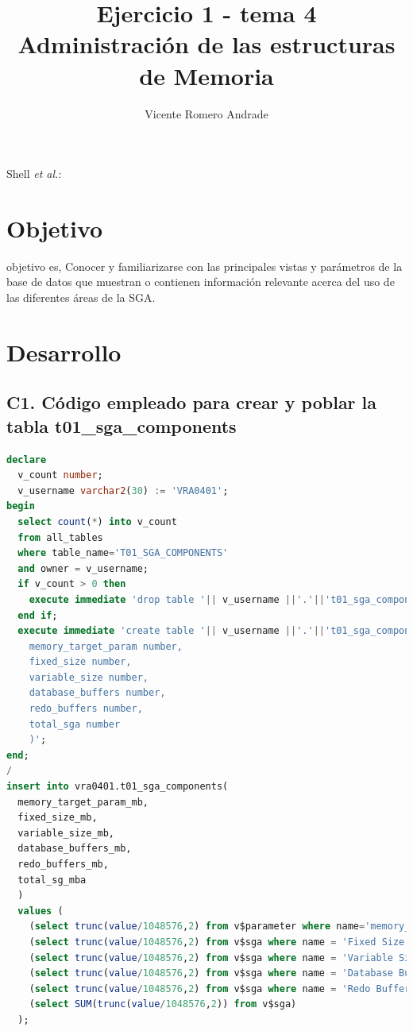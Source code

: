 \documentclass[journal]{IEEEtran}
\begin{document}
\title{Ejercicio 1 - tema 4 \\ Administración de las estructuras de Memoria}
%
\author{Vicente Romero Andrade}

%
{Shell \MakeLowercase{\textit{et al.}}: }

\maketitle


\IEEEpeerreviewmaketitle

\section{Objetivo}

 objetivo es, Conocer y familiarizarse con las principales vistas y parámetros 
de la base de datos que muestran o contienen información relevante acerca del uso
de las diferentes áreas de la SGA.

\section{Desarrollo}
\subsection{C1.  Código empleado para crear y poblar la tabla t01\_sga\_components}
\begin{lstlisting}[language=sql, caption=t01\_sga\_components,label={lst:codigo1}]
declare
  v_count number;
  v_username varchar2(30) := 'VRA0401';
begin
  select count(*) into v_count
  from all_tables
  where table_name='T01_SGA_COMPONENTS'
  and owner = v_username;
  if v_count > 0 then
    execute immediate 'drop table '|| v_username ||'.'||'t01_sga_components';
  end if;
  execute immediate 'create table '|| v_username ||'.'||'t01_sga_components(
    memory_target_param number,
    fixed_size number,
    variable_size number, 
    database_buffers number, 
    redo_buffers number,
    total_sga number
    )';
end;
/
insert into vra0401.t01_sga_components(
  memory_target_param_mb,
  fixed_size_mb, 
  variable_size_mb, 
  database_buffers_mb, 
  redo_buffers_mb,
  total_sg_mba
  ) 
  values (
    (select trunc(value/1048576,2) from v$parameter where name='memory_target'),
    (select trunc(value/1048576,2) from v$sga where name = 'Fixed Size'),
    (select trunc(value/1048576,2) from v$sga where name = 'Variable Size'),
    (select trunc(value/1048576,2) from v$sga where name = 'Database Buffers'),
    (select trunc(value/1048576,2) from v$sga where name = 'Redo Buffers'),
    (select SUM(trunc(value/1048576,2)) from v$sga)
  );
\end{lstlisting}
\end{document}
